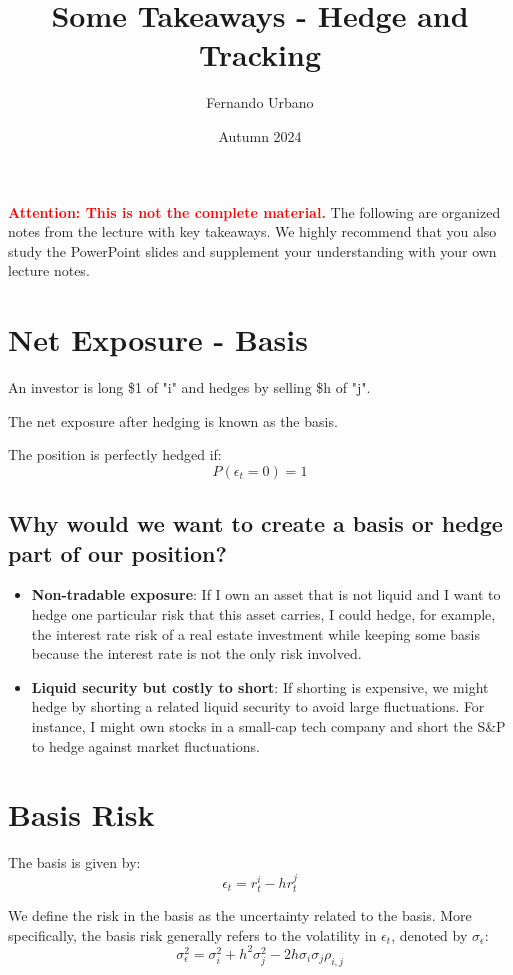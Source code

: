 \documentclass{article}
\title{Some Takeaways - Hedge and Tracking}
\author{Fernando Urbano}
\date{Autumn 2024}
\newcommand{\redbold}[1]{\textbf{\textcolor{red}{#1}}}
\begin{document}
\maketitle

\redbold{Attention: This is not the complete material.} The following are organized notes from the lecture with key takeaways. We highly recommend that you also study the PowerPoint slides and supplement your understanding with your own lecture notes.

\section{Net Exposure - Basis}
An investor is long \$1 of "i" and hedges by selling \$h of "j".

The net exposure after hedging is known as the basis.

The position is perfectly hedged if:
$$ P(\epsilon_t = 0) = 1 $$

\subsection{Why would we want to create a basis or hedge part of our position?}
\begin{itemize}
    \item \textbf{Non-tradable exposure}: If I own an asset that is not liquid and I want to hedge one particular risk that this asset carries, I could hedge, for example, the interest rate risk of a real estate investment while keeping some basis because the interest rate is not the only risk involved.
    \item \textbf{Liquid security but costly to short}: If shorting is expensive, we might hedge by shorting a related liquid security to avoid large fluctuations. For instance, I might own stocks in a small-cap tech company and short the S\&P to hedge against market fluctuations.
\end{itemize}

\section{Basis Risk}
The basis is given by:
$$ \epsilon_t = r_t^i - h r_t^j $$

We define the risk in the basis as the uncertainty related to the basis. More specifically, the basis risk generally refers to the volatility in $\epsilon_t$, denoted by $\sigma_{\epsilon}$:
$$ \sigma_{\epsilon}^2 = \sigma_i^2 + h^2 \sigma_j^2 - 2h \sigma_i \sigma_j \rho_{i,j} $$
\end{document}
